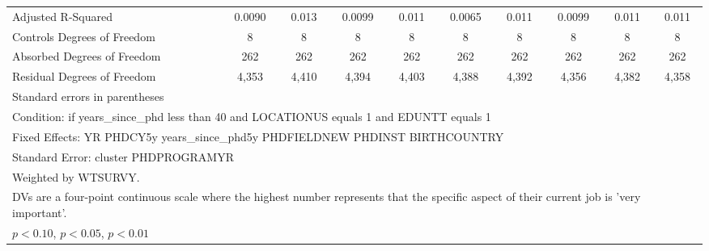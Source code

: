 \begin{table}[htbp]
\begin{tabular}{l*{9}{c}}
Adjusted R-Squared&      0.0090         &       0.013         &      0.0099         &       0.011         &      0.0065         &       0.011         &      0.0099         &       0.011         &       0.011         \\
Controls Degrees of Freedom&           8         &           8         &           8         &           8         &           8         &           8         &           8         &           8         &           8         \\
Absorbed Degrees of Freedom&         262         &         262         &         262         &         262         &         262         &         262         &         262         &         262         &         262         \\
Residual Degrees of Freedom&       4,353         &       4,410         &       4,394         &       4,403         &       4,388         &       4,392         &       4,356         &       4,382         &       4,358         \\
\hline\hline
\multicolumn{10}{l}{\footnotesize Standard errors in parentheses}\\
\multicolumn{10}{l}{\footnotesize Condition: if years\_since\_phd less than 40 and LOCATIONUS equals 1 and EDUNTT equals 1}\\
\multicolumn{10}{l}{\footnotesize Fixed Effects: YR PHDCY5y years\_since\_phd5y PHDFIELDNEW PHDINST BIRTHCOUNTRY}\\
\multicolumn{10}{l}{\footnotesize Standard Error: cluster PHDPROGRAMYR}\\
\multicolumn{10}{l}{\footnotesize Weighted by WTSURVY.}\\
\multicolumn{10}{l}{\footnotesize DVs are a four-point continuous scale where the highest number represents that the specific aspect of their current job is 'very important'.}\\
\multicolumn{10}{l}{\footnotesize \sym{*} \(p<0.10\), \sym{**} \(p<0.05\), \sym{***} \(p<0.01\)}\\
\end{tabular}
\end{table}
